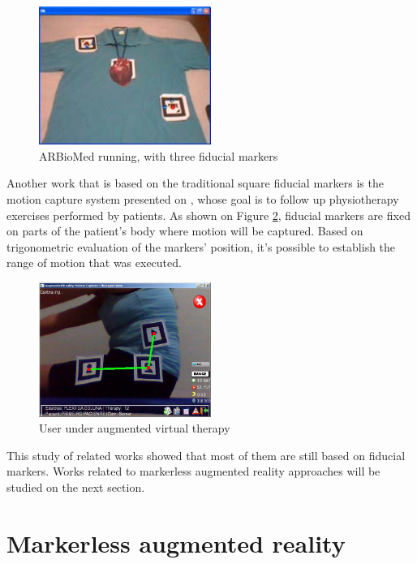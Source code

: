 \documentclass[msc, a4paper, classic, en]{ufbathesis}
\begin{document}
\begin{figure}
\centering
\includegraphics[width=0.5\textwidth]{images/arbiomed.png}
\caption{ARBioMed running, with three fiducial markers \cite{arbiomed}}
\label{fig:arbiomed}
\end{figure}

Another work that is based on the traditional square fiducial markers is the motion capture system presented on \cite{fisio}, whose goal is to follow up physiotherapy exercises performed by patients. As shown on Figure \ref{fig:fisio}, fiducial markers are fixed on parts of the patient's body where motion will be captured. Based on trigonometric evaluation of the markers' position, it's possible to establish the range of motion that was executed.

\begin{figure}
\centering
\includegraphics[width=0.5\textwidth]{images/fisio.png}
\caption{User under augmented virtual therapy \cite{fisio}}
\label{fig:fisio}
\end{figure}

This study of related works showed that most of them are still based on fiducial markers. Works related to markerless augmented reality approaches will be studied on the next section.

\section{Markerless augmented reality}
\end{document}
